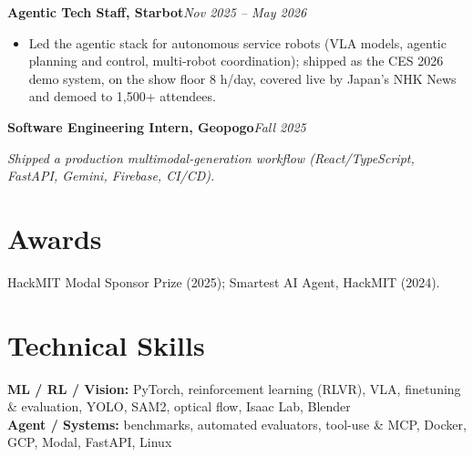 \documentclass[9pt, letterpaper]{extarticle}
\newcommand{\role}[2]{%
  \vspace{2.5pt}%
  \noindent\textbf{#1}\hfill\textit{#2}\par\vspace{1pt}%
}
\newcommand{\rolesub}[1]{%
  \noindent\textit{#1}\par\vspace{1pt}%
}
\begin{document}
\role{Agentic Tech Staff, Starbot}{Nov 2025 -- May 2026}
\begin{itemize}
  \item Led the agentic stack for autonomous service robots (VLA models, agentic planning and control, multi-robot coordination); shipped as the CES 2026 demo system, on the show floor 8 h/day, covered live by Japan's NHK News and demoed to 1{,}500+ attendees.
\end{itemize}

\role{Software Engineering Intern, Geopogo}{Fall 2025}
\rolesub{Shipped a production multimodal-generation workflow (React/TypeScript, FastAPI, Gemini, Firebase, CI/CD).}

\section{Awards}
HackMIT Modal Sponsor Prize (2025); Smartest AI Agent, HackMIT (2024).

\section{Technical Skills}
\textbf{ML / RL / Vision:} PyTorch, reinforcement learning (RLVR), VLA, finetuning \& evaluation, YOLO, SAM2, optical flow, Isaac Lab, Blender\\[0.5pt]
\textbf{Agent / Systems:} benchmarks, automated evaluators, tool-use \& MCP, Docker, GCP, Modal, FastAPI, Linux
\end{document}
